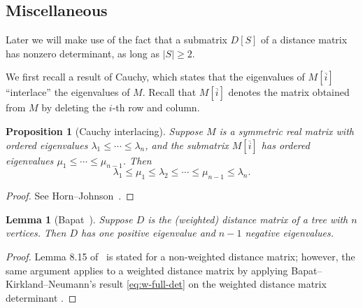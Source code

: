 \documentclass{amsart}
\newtheorem{prop}[thm]{Proposition}
\newtheorem{lem}[thm]{Lemma}
\theoremstyle{definition}
\begin{document}
\subsection{Miscellaneous}

Later we will make use of the fact that a submatrix $D[S]$ of a distance matrix has nonzero determinant, as long as $|S| \geq 2$.

We first recall a result of Cauchy, which states that the eigenvalues of $M[\overline{i}]$ ``interlace'' the eigenvalues of $M$.
Recall that $M[\overline{i}]$ denotes the matrix obtained from $M$ by deleting the $i$-th row and column.

\begin{prop}[Cauchy interlacing]
\label{prop:cauchy-interlacing}
Suppose $M$ is a symmetric real matrix 
with ordered eigenvalues $\lambda_1 \leq \cdots \leq \lambda_n$, 
and  the submatrix $M[\overline{i}]$ has ordered eigenvalues $\mu_1 \leq \cdots \leq \mu_{n-1}$.
Then
\[
	\lambda_1 \leq \mu_1 \leq \lambda_2 \leq \cdots \leq \mu_{n-1} \leq \lambda_n.
\]
\end{prop}
\begin{proof}
See Horn--Johnson~\cite[Theorem 4.3.17]{horn-johnson}.
\end{proof}

\begin{lem}[{Bapat~\cite[Lemma 8.15]{bapat}}]
\label{lem:dist-signature}
Suppose $D$ is the (weighted) distance matrix of a tree with $n$ vertices. 
Then $D$ has one positive eigenvalue and $n - 1$ negative eigenvalues.
\end{lem}
\begin{proof}
Lemma 8.15 of~\cite{bapat} is stated for a non-weighted distance matrix;
however, the same argument applies to a weighted distance matrix by applying Bapat--Kirkland--Neumann's result \eqref{eq:w-full-det} on the weighted distance matrix determinant \cite[Corollary 2.5]{bapat-kirkland-neumann}. 
\end{proof}
\end{document}
